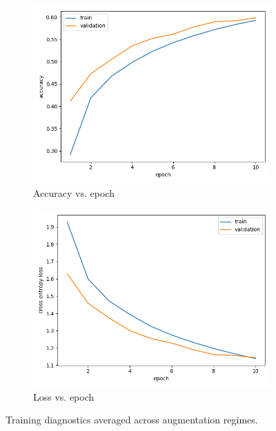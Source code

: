 \documentclass{article}
\begin{document}
\begin{figure}[ht]
  \centering
  \begin{subfigure}[b]{0.48\linewidth}
    \includegraphics[width=\linewidth]{train_val_accuracy.png}
    \caption{Accuracy vs. epoch}
  \end{subfigure}
  \begin{subfigure}[b]{0.48\linewidth}
    \includegraphics[width=\linewidth]{train_val_loss.png}
    \caption{Loss vs. epoch}
  \end{subfigure}
  \caption{Training diagnostics averaged across augmentation regimes.}
  \label{fig:diagnostics}
\end{figure}
\end{document}
